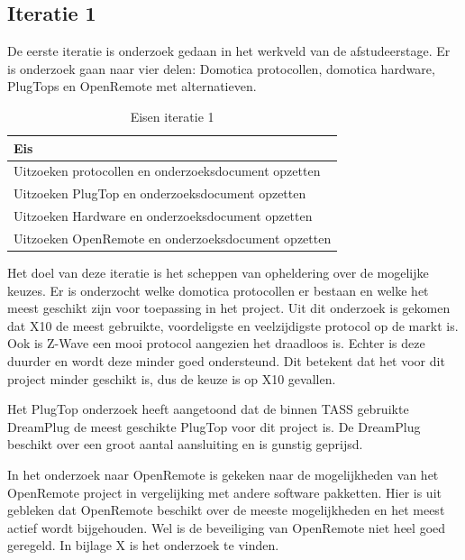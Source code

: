 \documentclass[]{article}
\begin{document}
\subsection{Iteratie 1}
De eerste iteratie is onderzoek gedaan in het werkveld van de afstudeerstage.
Er is onderzoek gaan naar vier delen: Domotica protocollen, domotica hardware,
PlugTops en OpenRemote met alternatieven. 

\begin{table}[htpb]
  \caption{Eisen iteratie 1}
  \begin{center}
    \begin{tabular}{|| l ||}\hline
        Eis                                                  \\\hline\hline
        Uitzoeken protocollen en onderzoeksdocument opzetten \\\hline
        Uitzoeken PlugTop en onderzoeksdocument opzetten     \\\hline
        Uitzoeken Hardware en onderzoeksdocument opzetten    \\\hline
        Uitzoeken OpenRemote en onderzoeksdocument opzetten  \\\hline
    \end{tabular}
  \end{center}
\end{table}

Het doel van deze iteratie is het scheppen van opheldering over de mogelijke
keuzes. Er is onderzocht welke domotica protocollen er bestaan en welke het
meest geschikt zijn voor toepassing in het project. Uit dit onderzoek is gekomen
dat X10 de meest gebruikte, voordeligste en veelzijdigste protocol op de markt
is. Ook is Z-Wave een mooi protocol aangezien het draadloos is. Echter is deze
duurder en wordt deze minder goed ondersteund. Dit betekent dat het voor dit
project minder geschikt is, dus de keuze is op X10 gevallen.  

Het PlugTop onderzoek heeft aangetoond dat de binnen TASS gebruikte
DreamPlug de meest geschikte PlugTop voor dit project is. De DreamPlug
beschikt over een groot aantal aansluiting en is gunstig geprijsd. 

In het onderzoek naar OpenRemote is gekeken naar de mogelijkheden van het
OpenRemote project in vergelijking met andere software pakketten. Hier is uit
gebleken dat OpenRemote beschikt over de meeste mogelijkheden en het meest
actief wordt bijgehouden. Wel is de beveiliging van OpenRemote niet heel
goed geregeld. In bijlage X is het onderzoek te vinden.
\end{document}
